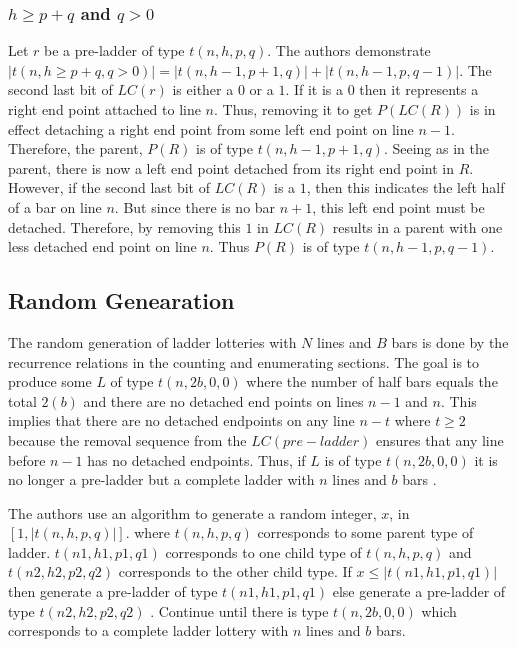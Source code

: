 \subsubsection{ $h\geq p+q$ and $q>0$}
Let $r$ be a pre-ladder of type $t(n,h,p,q)$. The authors 
demonstrate $|t(n,h\geq p+q,q>0)|=|t(n,h-1,p+1,q)|+|t(n,h-1,p,q-1)|$.\cite{A6} 
The second last bit of $LC(r)$ is either a $0$ 
or a $1$. If it is a $0$ then it represents a 
right end point attached to line $n$. Thus, 
removing it to get $P(LC(R))$ is in effect 
detaching a right end point from some left end point 
on line $n-1$. Therefore, the parent, $P(R)$ is 
of type $t(n,h-1,p+1,q)$. Seeing as in the parent, 
there is now a left end point detached from its right 
end point in $R$. However, if the second last bit 
of $LC(R)$ is a $1$, then this indicates the left 
half of a bar on line $n$. But since there is no 
bar $n+1$, this left end point must be detached. 
Therefore, by removing this $1$ in $LC(R)$ results 
in a parent with one less detached end point on line $n$.
Thus $P(R)$ is of type $t(n,h-1,p,q-1)$.
\subsection{Random Genearation}
The random generation of ladder lotteries with $N$ lines and
$B$ bars is done by the recurrence relations in the counting 
and enumerating sections. The goal is to produce 
some $L$ of type $t(n,2b,0,0)$ where the number of half 
bars equals the total $2(b)$ and there are no detached 
end points on lines $n-1$ and $n$. This implies that there 
are no detached endpoints on any line $n-t$ where $t\geq2$
because the removal sequence from the $LC(pre-ladder)$
ensures that any line before $n-1$ has no detached endpoints. Thus, 
if $L$ is of type $t(n,2b,0,0)$ it is no longer a pre-ladder 
but a complete ladder with $n$ lines and $b$ bars \cite{A6}.\par 
The authors use an algorithm to generate a random integer, $x$,
in $[1,|t(n,h,p,q)|]$. where $t(n,h,p,q)$ corresponds to some 
parent type of ladder. $t(n1,h1,p1,q1)$ corresponds to one 
child type of $t(n,h,p,q)$ and $t(n2,h2,p2,q2)$ corresponds 
to the other child type. If $x\leq|t(n1,h1,p1,q1)|$ then generate 
a pre-ladder of type $t(n1,h1,p1,q1)$ else generate a pre-ladder 
of type $t(n2,h2,p2,q2)$ \cite{A6}. Continue until there is type $t(n,2b,0,0)$
which corresponds to a complete ladder lottery with $n$ lines and $b$ bars.